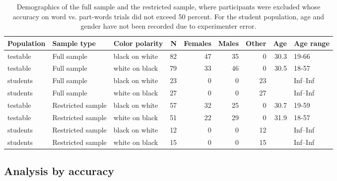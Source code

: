 \documentclass[
]{article}
\begin{document}
\begin{longtable}[t]{lllrrrrrl}
\caption{\label{tab:vsl-simultaneous-fa-demographics}Demographics of the full sample and the restricted sample, where participants were excluded whose accuracy on word vs. part-words trials did not exceed 50 percent. For the student population, age and gender have not been recorded due to experimenter error.}\\
\toprule
Population & Sample type & Color polarity & N & Females & Males & Other & Age & Age range\\
\midrule
testable & Full sample & black on white & 82 & 47 & 35 & 0 & 30.3 & 19-66\\
testable & Full sample & white on black & 79 & 33 & 46 & 0 & 30.5 & 18-57\\
students & Full sample & black on white & 23 & 0 & 0 & 23 &  & Inf--Inf\\
students & Full sample & white on black & 27 & 0 & 0 & 27 &  & Inf--Inf\\
testable & Restricted sample & black on white & 57 & 32 & 25 & 0 & 30.7 & 19-59\\
\addlinespace
testable & Restricted sample & white on black & 51 & 22 & 29 & 0 & 31.9 & 18-57\\
students & Restricted sample & black on white & 12 & 0 & 0 & 12 &  & Inf--Inf\\
students & Restricted sample & white on black & 15 & 0 & 0 & 15 &  & Inf--Inf\\
\bottomrule
\end{longtable}

\subsection{Analysis by accuracy}\label{analysis-by-accuracy}
\end{document}
